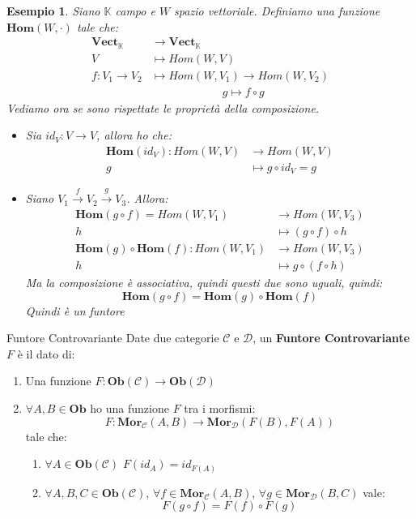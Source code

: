\documentclass[11pt,a4paper,twoside]{article}
\newtheorem{es}{Esempio}
\theoremstyle{definition}
\begin{document}
\begin{es}
	Siano $\mathbb K$ campo e $W$ spazio vettoriale. Definiamo una funzione $\bm{Hom}(W, \cdot)$ tale che:
	\begin{align*}
		\bm{Vect}_\mathbb K & \to \bm{Vect}_\mathbb K\\
		V & \mapsto  Hom(W,V)\\
		f:V_1 \to V_2 &\mapsto Hom(W, V_1) \to Hom(W, V_2)\\
		& \qquad \qquad \qquad \; g \mapsto f \circ g
	\end{align*}
	Vediamo ora se sono rispettate le proprietà della composizione.
	\begin{itemize}
		\item Sia $id_V : V \to V$, allora ho che:
			\begin{align*}
				\bm{Hom}(id_V): Hom(W, V) & \to Hom(W, V)\\
				g & \mapsto g \circ id_V = g
			\end{align*}
		\item Siano $V_1 \xrightarrow{f} V_2 \xrightarrow{g} V_3$. Allora:
			\begin{align*}
				\bm{Hom}(g \circ f) = Hom(W, V_1) & \to Hom(W, V_3)\\
				h & \mapsto (g \circ f) \circ h\\
				\bm{Hom}(g) \circ \bm{Hom}(f): Hom(W, V_1) & \to Hom(W, V_3)\\
				h & \mapsto g\circ (f \circ h)
			\end{align*}
			Ma la composizione è associativa, quindi questi due sono uguali, quindi:
			\[ \bm{Hom}(g \circ f) = \bm{Hom}(g) \circ \bm{Hom}(f) \]
			Quindi è un funtore
	\end{itemize}
\end{es}

\begin{defn}{Funtore Controvariante}{}
	Date due categorie $\mathcal C$ e $\mathcal D$, un \textbf{Funtore Controvariante} $F$ è il dato di:
	\begin{enumerate}
		\item Una funzione $F: \bm{Ob}(\mathcal C) \to \bm{Ob}(\mathcal D)$
		\item $\forall A,B \in \bm{Ob}$ ho una funzione $F$ tra i morfismi:
			\[ F: \bm{Mor}_\mathcal C(A,B) \to \bm{Mor}_\mathcal D (F(B), F(A)) \]
			tale che:
			\begin{enumerate}
				\item $\forall A \in \bm{Ob}(\mathcal C)$ $F(id_A) = id_{F(A)}$
				\item $\forall A, B, C \in \bm{Ob}(\mathcal C)$, $\forall f \in \bm{Mor}_\mathcal C(A, B)$, $\forall g \in \bm{Mor}_\mathcal D(B, C)$ vale:
					\[ F(g \circ f) = F(f) \circ F(g)\]
			\end{enumerate}
	\end{enumerate}
\end{defn}
\end{document}
